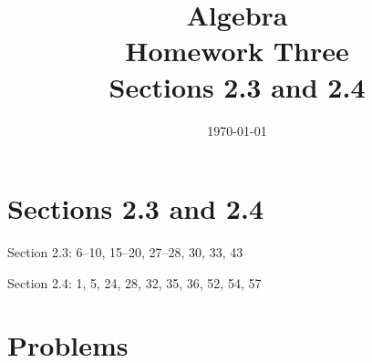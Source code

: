 \documentclass[letterpaper]{exam}
\title{Algebra \\ Homework Three \\ Sections 2.3 and 2.4}
\author{}
\date{\today}
\begin{document}
  \maketitle

  \section{Sections 2.3 and 2.4}
  \begin{itemize*}
    \item Section 2.3: 6--10, 15--20, 27--28, 30, 33, 43
    \item Section 2.4: 1, 5, 24, 28, 32, 35, 36, 52, 54, 57
  \end{itemize*}

  \section{Problems}
\end{document}
